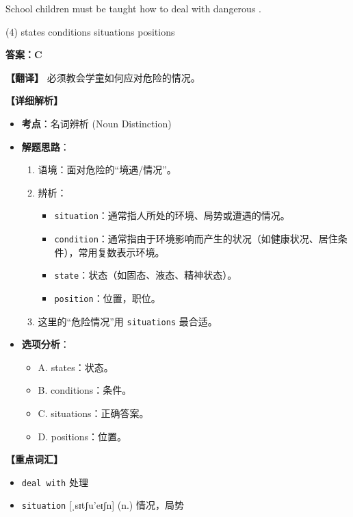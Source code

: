 \documentclass[11pt, a4paper]{article}
\newcommand{\analysis}[4]{
    \begin{solutionbox}
        \textbf{答案：#1}
        
        \textbf{【翻译】} #2
        
        \textbf{【详细解析】}
        #3
        
        \textbf{【重点词汇】}
        #4
    \end{solutionbox}
}
\newcommand{\blank}{\underline{\hspace{1.5cm}}}
\begin{document}
\begin{questions}
    \item School children must be taught how to deal with dangerous \blank.
    \begin{tasks}(4)
        \task states \task conditions \task situations \task positions
    \end{tasks}
    \analysis{C}{必须教会学童如何应对危险的情况。}{
        \begin{itemize}
            \item \textbf{考点}：名词辨析 (Noun Distinction)
            \item \textbf{解题思路}：
                \begin{enumerate}
                    \item 语境：面对危险的“境遇/情况”。
                    \item 辨析：
                        \begin{itemize}
                            \item \texttt{situation}：通常指人所处的环境、局势或遭遇的情况。
                            \item \texttt{condition}：通常指由于环境影响而产生的状况（如健康状况、居住条件），常用复数表示环境。
                            \item \texttt{state}：状态（如固态、液态、精神状态）。
                            \item \texttt{position}：位置，职位。
                        \end{itemize}
                    \item 这里的“危险情况”用 \texttt{situations} 最合适。
                \end{enumerate}
            \item \textbf{选项分析}：
                \begin{itemize}
                    \item A. states：状态。
                    \item B. conditions：条件。
                    \item C. situations：正确答案。
                    \item D. positions：位置。
                \end{itemize}
        \end{itemize}
    }{
        \begin{itemize}
            \item \texttt{deal with} 处理
            \item \texttt{situation} [ˌsɪtʃu'eɪʃn] (n.) 情况，局势
        \end{itemize}
    }


\end{questions}
\end{document}
